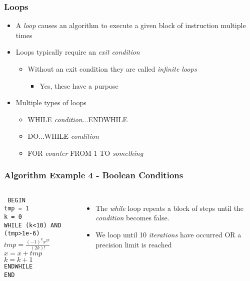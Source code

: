 \documentclass[14pt]{beamer}
\begin{document}
\begin{frame}
\frametitle{Loops}
\begin{itemize}
\item A \textit{loop} causes an algorithm to execute a given block of instruction multiple times
\item Loops typically require an \textit{exit condition}
	\begin{itemize}
		\item Without an exit condition they are called \textit{infinite loops}
		\begin{itemize}
			\item Yes, these have a purpose
		\end{itemize}
	\end{itemize}
\item Multiple types of loops
	\begin{itemize}
		\item WHILE \textit{condition}...ENDWHILE
		\item DO...WHILE \textit{condition}
		\item FOR \textit{counter} FROM 1 TO \textit{something}
	\end{itemize}
\end{itemize}
\end{frame}

\begin{frame}[fragile]
\frametitle{Algorithm Example 4 - Boolean Conditions}
\begin{columns}
\column{2.9in}
{\small
\texttt{
 BEGIN\\
\quad tmp = 1\\
\quad k = 0\\
\quad WHILE (k<10) AND (tmp>1e-6)\\
\quad \quad $tmp = \frac{(-1)^k x^{2k}}{(2k)!}$\\
\quad \quad $x = x + tmp$\\
\quad \quad $k = k + 1$\\
\quad ENDWHILE \\
 END \\
}
}
\column{2in}
\begin{itemize}
\item The \textit{while} loop repeats a block of steps until the \textit{condition} becomes false.
\item We loop until 10 \textit{iterations} have occurred OR a precision limit is reached
\end{itemize}
\end{columns}
\end{frame}
\end{document}

